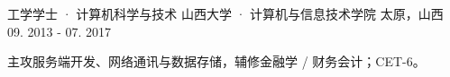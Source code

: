 
\begin{cventries}
  \cventry
    {工学学士 · 计算机科学与技术}
    {山西大学 · 计算机与信息技术学院}
    {太原，山西}
    {09. 2013 - 07. 2017}
    {
      \begin{cvitems}
        \item {主攻服务端开发、网络通讯与数据存储，辅修金融学 / 财务会计；CET-6。}
      \end{cvitems}
    }
\end{cventries}
